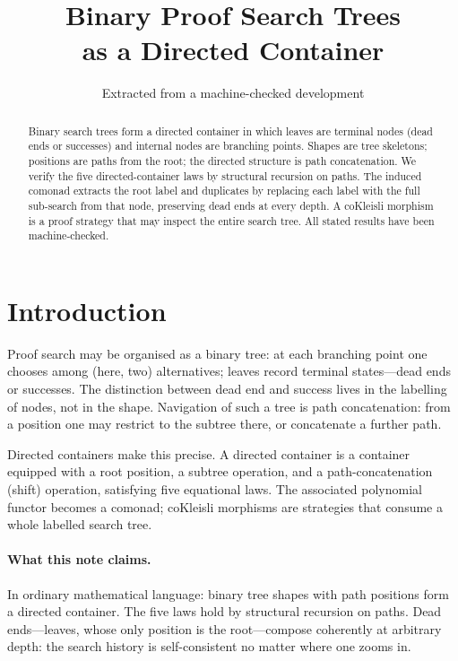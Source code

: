 \documentclass[11pt,a4paper]{article}
\title{Binary Proof Search Trees\\
  as a Directed Container}
\author{Extracted from a machine-checked development}
\date{}
\theoremstyle{plain}
\theoremstyle{definition}
\begin{document}
\maketitle

\begin{abstract}
Binary search trees form a directed container in which leaves are
terminal nodes (dead ends or successes) and internal nodes are branching
points. Shapes are tree skeletons; positions are paths from the root;
the directed structure is path concatenation. We verify the five
directed-container laws by structural recursion on paths. The induced
comonad extracts the root label and duplicates by replacing each label
with the full sub-search from that node, preserving dead ends at every
depth. A coKleisli morphism is a proof strategy that may inspect the
entire search tree. All stated results have been machine-checked.
\end{abstract}

\tableofcontents
\bigskip

\section{Introduction}

Proof search may be organised as a binary tree: at each branching point
one chooses among (here, two) alternatives; leaves record terminal
states---dead ends or successes. The distinction between dead end and
success lives in the labelling of nodes, not in the shape. Navigation of
such a tree is path concatenation: from a position one may restrict to
the subtree there, or concatenate a further path.

Directed containers make this precise. A directed container is a
container equipped with a root position, a subtree operation, and a
path-concatenation (shift) operation, satisfying five equational laws.
The associated polynomial functor becomes a comonad; coKleisli morphisms
are strategies that consume a whole labelled search tree.

\paragraph{What this note claims.}
In ordinary mathematical language: binary tree shapes with path
positions form a directed container. The five laws hold by structural
recursion on paths. Dead ends---leaves, whose only position is the
root---compose coherently at arbitrary depth: the search history is
self-consistent no matter where one zooms in.
\end{document}
